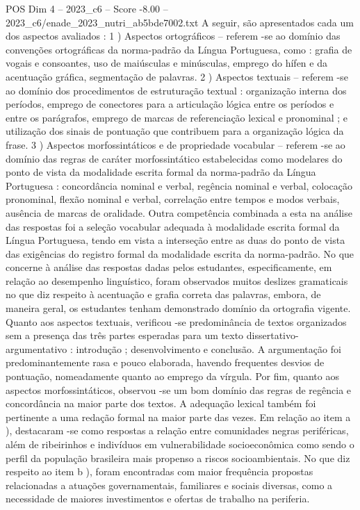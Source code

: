 \begin{textsample}{POS Dim 4 – 2023\_c6 – Score -8.00 – 2023\_c6/enade\_2023\_nutri\_ab5bde7002.txt}
A seguir, são apresentados cada um dos aspectos avaliados : 1 ) Aspectos ortográficos – referem -se ao domínio das convenções ortográficas da norma-padrão da Língua Portuguesa, como : grafia de vogais e consoantes, uso de maiúsculas e minúsculas, emprego do hífen e da acentuação gráfica, segmentação de palavras. 2 ) Aspectos textuais – referem -se ao domínio dos procedimentos de estruturação textual : organização interna dos períodos, emprego de conectores para a articulação lógica entre os períodos e entre os parágrafos, emprego de marcas de referenciação lexical e pronominal ; e utilização dos sinais de pontuação que contribuem para a organização lógica da frase. 3 ) Aspectos morfossintáticos e de propriedade vocabular – referem -se ao domínio das regras de caráter morfossintático estabelecidas como modelares do ponto de vista da modalidade escrita formal da norma-padrão da Língua Portuguesa : concordância nominal e verbal, regência nominal e verbal, colocação pronominal, flexão nominal e verbal, correlação entre tempos e modos verbais, ausência de marcas de oralidade.
Outra competência combinada a esta na análise das respostas foi a seleção vocabular adequada à modalidade escrita formal da Língua Portuguesa, tendo em vista a interseção entre as duas do ponto de vista das exigências do registro formal da modalidade escrita da norma-padrão.
No que concerne à análise das respostas dadas pelos estudantes, especificamente, em relação ao desempenho linguístico, foram observados muitos deslizes gramaticais no que diz respeito à acentuação e grafia correta das palavras, embora, de maneira geral, os estudantes tenham demonstrado domínio da ortografia vigente.
Quanto aos aspectos textuais, verificou -se predominância de textos organizados sem a presença das três partes esperadas para um texto dissertativo-argumentativo : introdução ; desenvolvimento e conclusão.
A argumentação foi predominantemente rasa e pouco elaborada, havendo frequentes desvios de pontuação, nomeadamente quanto ao emprego da vírgula.
Por fim, quanto aos aspectos morfossintáticos, observou -se um bom domínio das regras de regência e concordância na maior parte dos textos.
A adequação lexical também foi pertinente a uma redação formal na maior parte das vezes.
Em relação ao item a ), destacaram -se como respostas a relação entre comunidades negras periféricas, além de ribeirinhos e indivíduos em vulnerabilidade socioeconômica como sendo o perfil da população brasileira mais propenso a riscos socioambientais.
No que diz respeito ao item b ), foram encontradas com maior frequência propostas relacionadas a atuações governamentais, familiares e sociais diversas, como a necessidade de maiores investimentos e ofertas de trabalho na periferia.

\end{textsample}
